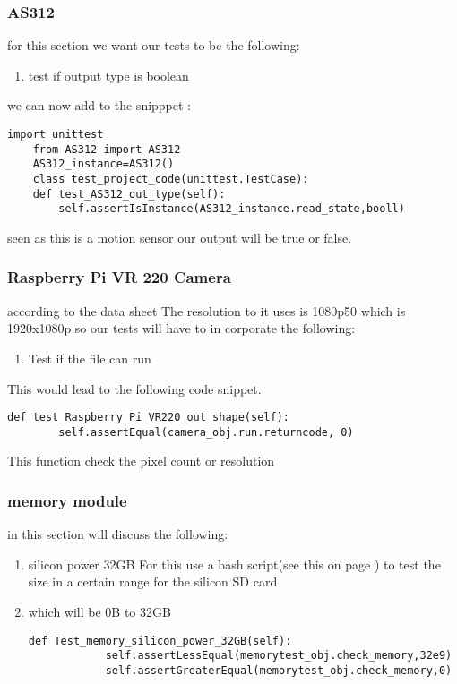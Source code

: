 \subsubsection{AS312}
for  this section  we  want our  tests  to  be  the following:
\begin{enumerate}
    \item test if output type is boolean 
\end{enumerate}
we can  now add to the snipppet :
\begin{lstlisting}[style=mystyle,caption={unit test for AS312}]
    import unittest
    from AS312 import AS312
    AS312_instance=AS312()
    class test_project_code(unittest.TestCase):
    def test_AS312_out_type(self):
        self.assertIsInstance(AS312_instance.read_state,booll)
\end{lstlisting}
seen as  this is a motion sensor  our output will be true or false.

\subsubsection{Raspberry Pi VR 220 Camera}
according to the  data sheet \cite{Camera} The  resolution to  it uses is  1080p50 which is 1920x1080p so our  tests will have to  in corporate  the  following:
\begin{enumerate}
    \item Test  if the file can run
\end{enumerate}
This would lead to the following code snippet.
\begin{lstlisting}[style=mystyle,caption={camera unit test}]
    def test_Raspberry_Pi_VR220_out_shape(self):
        self.assertEqual(camera_obj.run.returncode, 0)
\end{lstlisting}
This function check the pixel count or resolution

\subsubsection{memory module}
in this section will discuss the following:
\begin{enumerate}
    \item silicon power 32GB 
For this use a  bash script(see this on page \pageref{TDD sample bash}) to test the size in a  certain range for the silicon  SD card
    \item which will be 0B to 32GB
    
    \begin{lstlisting}[style=mystyle]
        def Test_memory_silicon_power_32GB(self):
            self.assertLessEqual(memorytest_obj.check_memory,32e9)
            self.assertGreaterEqual(memorytest_obj.check_memory,0)
    \end{lstlisting}
\end{enumerate} 
